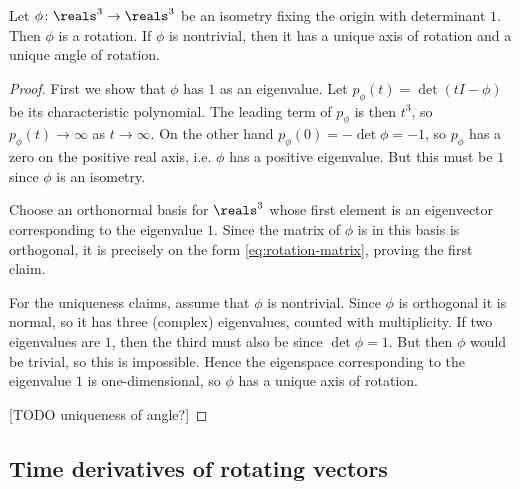\documentclass[article, a4paper, 11pt, oneside]{memoir}
\numberwithin{equation}{chapter}
\begin{document}
\begin{theorem}
    Let $\phi \colon \reals^3 \to \reals^3$ be an isometry fixing the origin with determinant $1$. Then $\phi$ is a rotation. If $\phi$ is nontrivial, then it has a unique axis of rotation and a unique angle of rotation.
\end{theorem}

\begin{proof}
    First we show that $\phi$ has $1$ as an eigenvalue. Let $p_\phi(t) = \det(tI - \phi)$ be its characteristic polynomial. The leading term of $p_\phi$ is then $t^3$, so $p_\phi(t) \to \infty$ as $t \to \infty$. On the other hand $p_\phi(0) = -\det\phi = -1$, so $p_\phi$ has a zero on the positive real axis, i.e. $\phi$ has a positive eigenvalue. But this must be $1$ since $\phi$ is an isometry.

    Choose an orthonormal basis for $\reals^3$ whose first element is an eigenvector corresponding to the eigenvalue $1$. Since the matrix of $\phi$ is in this basis is orthogonal, it is precisely on the form \cref{eq:rotation-matrix}, proving the first claim.

    For the uniqueness claims, assume that $\phi$ is nontrivial. Since $\phi$ is orthogonal it is normal, so it has three (complex) eigenvalues, counted with multiplicity. If two eigenvalues are $1$, then the third must also be since $\det\phi = 1$. But then $\phi$ would be trivial, so this is impossible. Hence the eigenspace corresponding to the eigenvalue $1$ is one-dimensional, so $\phi$ has a unique axis of rotation.

    [TODO uniqueness of angle?]
\end{proof}


\subsection{Time derivatives of rotating vectors}
\end{document}
